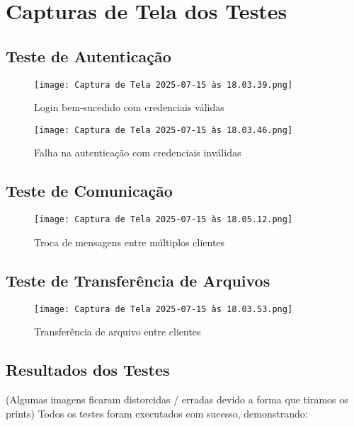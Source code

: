 \documentclass[12pt,a4paper]{article}
\begin{document}
\section{Capturas de Tela dos Testes}

\subsection{Teste de Autenticação}

\begin{figure}[H]
    \centering
    \texttt{[image: Captura de Tela 2025-07-15 às 18.03.39.png]}
    \caption{Login bem-sucedido com credenciais válidas}
    \label{fig:login_sucesso}
\end{figure}

\begin{figure}[H]
    \centering
    \texttt{[image: Captura de Tela 2025-07-15 às 18.03.46.png]}
    \caption{Falha na autenticação com credenciais inválidas}
    \label{fig:login_falha}
\end{figure}

\subsection{Teste de Comunicação}

\begin{figure}[H]
    \centering
    \texttt{[image: Captura de Tela 2025-07-15 às 18.05.12.png]}
    \caption{Troca de mensagens entre múltiplos clientes}
    \label{fig:mensagens}
\end{figure}


\subsection{Teste de Transferência de Arquivos}

\begin{figure}[H]
    \centering
    \texttt{[image: Captura de Tela 2025-07-15 às 18.03.53.png]}
    \caption{Transferência de arquivo entre clientes}
    \label{fig:arquivo}
\end{figure}

\subsection{Resultados dos Testes}

(Algumas imagens ficaram distorcidas / erradas devido a forma que tiramos os prints) Todos os testes foram executados com sucesso, demonstrando:
\end{document}
